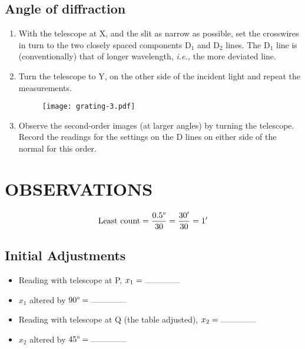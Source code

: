 \documentclass[12pt,a4paper]{article}
\begin{document}
		\subsection{Angle of diffraction}
			
			\begin{enumerate}
				\item	With the telescope at X, and the slit as narrow as possible, set the crosswires in turn to the two closely spaced components D$_{1}$ and D$_{2}$ lines. The D$_{1}$ line is (conventionally) that of longer wavelength, \textit{i.e.,} the more deviated line. 
				
				\item	Turn the telescope to Y, on the other side of the incident light and repeat the measurements.
				
				\begin{figure}[!htb]
					\centering
					\texttt{[image: grating-3.pdf]}
					\caption{}
				\end{figure}
				
				\item	Observe the second-order images (at larger angles) by turning the telescope. Record the readings for the settings on the D lines on either side of the normal for this order.
			\end{enumerate}			 
			
			\section{OBSERVATIONS}
				
				$$ \text{Least count} = \dfrac{0.5\degree}{30}=\dfrac{30'}{30}=1'$$
				
				\subsection{Initial Adjustments}
					
					\begin{itemize}
						\item	Reading with telescope at P, $x_{1}= \rule{10ex}{0.2pt}$
						\item	$x_{1}$ altered by $90\degree = \rule{10ex}{0.2pt}$
						
						\item	Reading with telescope at Q (the table adjusted), $x_{2}= \rule{10ex}{0.2pt}$
						\item	$x_{2}$ altered by $45\degree = \rule{10ex}{0.2pt}$
					\end{itemize}
			
\end{document}
